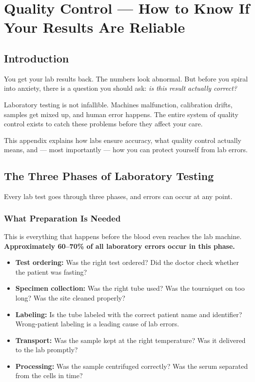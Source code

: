\chapter{Quality Control --- How to Know If Your Results Are Reliable}
\label{app:quality_control}

\clearpage
\section{Introduction}

You get your lab results back. The numbers look abnormal. But before you spiral into anxiety, there is a question you should ask: \emph{is this result actually correct?}

Laboratory testing is not infallible. Machines malfunction, calibration drifts, samples get mixed up, and human error happens. The entire system of quality control exists to catch these problems before they affect your care.

This appendix explains how labs ensure accuracy, what quality control actually means, and --- most importantly --- how you can protect yourself from lab errors.

\clearpage
\section{The Three Phases of Laboratory Testing}

Every lab test goes through three phases, and errors can occur at any point.

\subsection{What Preparation Is Needed}

This is everything that happens before the blood even reaches the lab machine. \textbf{Approximately 60--70\% of all laboratory errors occur in this phase.}

\begin{itemize}
    \item \textbf{Test ordering:} Was the right test ordered? Did the doctor check whether the patient was fasting?
    \item \textbf{Specimen collection:} Was the right tube used? Was the tourniquet on too long? Was the site cleaned properly?
    \item \textbf{Labeling:} Is the tube labeled with the correct patient name and identifier? Wrong-patient labeling is a leading cause of lab errors.
    \item \textbf{Transport:} Was the sample kept at the right temperature? Was it delivered to the lab promptly?
    \item \textbf{Processing:} Was the sample centrifuged correctly? Was the serum separated from the cells in time?
\end{itemize}

